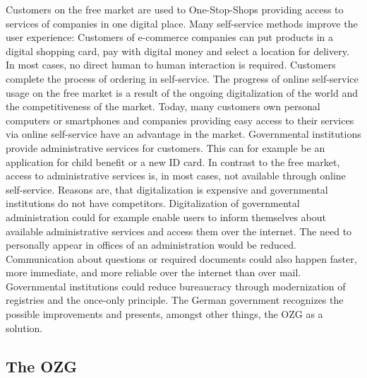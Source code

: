 \documentclass[
     12pt,         %
     a4paper,      %
     BCOR=10mm,version=first,     %
     DIV=14,version=first,        %
     ]{scrreprt}
\begin{document}
Customers on the free market are used to One-Stop-Shops providing access to services of companies in one digital place. Many self-service methods improve the user experience: Customers of e-commerce companies can put products in a digital shopping card, pay with digital money and select a location for delivery. In most cases, no direct human to human interaction is required. Customers complete the process of ordering in self-service. The progress of online self-service usage on the free market is a result of the ongoing digitalization of the world and the competitiveness of the market. Today, many customers own personal computers or smartphones and companies providing easy access to their services via online self-service have an advantage in the market.
Governmental institutions provide administrative services for customers. This can for example be an application for child benefit or a new ID card. In contrast to the free market, access to administrative services is, in most cases, not available through online self-service. Reasons are, that digitalization is expensive and governmental institutions do not have competitors.
Digitalization of governmental administration could for example enable users to inform themselves about available administrative services and access them over the internet. The need to personally appear in offices of an administration would be reduced. Communication about questions or required documents could also happen faster, more immediate, and more reliable over the internet than over mail. Governmental institutions could reduce bureaucracy through modernization of registries and the once-only principle.
The German government recognizes the possible improvements and presents, amongst other things, the OZG as a solution. \cite{IT-Planungsrat:Herausforderung}

\subsection{The OZG}
\end{document}
